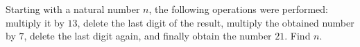 Starting with a natural number $n$, the following operations were performed: multiply it by $13$, delete the last digit of the result, multiply the obtained number by $7$, delete the last digit again, and finally obtain the number $21$. Find $n$.
